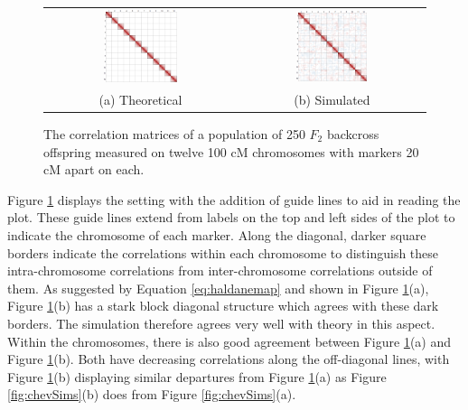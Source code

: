 \documentclass{article}
\begin{document}
\begin{figure}[htp]
  \begin{center}
    \begin{tabular}{cc}
      \includegraphics[width = 0.4\textwidth]{./img/LBSimTheory.png} &
      \includegraphics[width = 0.4\textwidth]{./img/LBSim.png} \\
      {\footnotesize (a) Theoretical} &
      {\footnotesize (b) Simulated} \\
    \end{tabular}
  \end{center}
  \caption{The correlation matrices of a population of 250 $F_2$ backcross offspring measured on twelve 100 cM chromosomes with markers 20 cM apart on each.}
  \label{fig:LBSims}
\end{figure}

Figure \ref{fig:LBSims} displays the \cite{LanderBotstein1989} setting with the addition of guide lines to aid in reading the plot. These guide lines extend from labels on the top and left sides of the plot to indicate the chromosome of each marker. Along the diagonal, darker square borders indicate the correlations within each chromosome to distinguish these intra-chromosome correlations from inter-chromosome correlations outside of them. As suggested by Equation \ref{eq:haldanemap} and shown in Figure \ref{fig:LBSims}(a), Figure \ref{fig:LBSims}(b) has a stark block diagonal structure which agrees with these dark borders. The simulation therefore agrees very well with theory in this aspect. Within the chromosomes, there is also good agreement between Figure \ref{fig:LBSims}(a) and Figure \ref{fig:LBSims}(b). Both have decreasing correlations along the off-diagonal lines, with Figure \ref{fig:LBSims}(b) displaying similar departures from Figure \ref{fig:LBSims}(a) as Figure \ref{fig:chevSims}(b) does from Figure \ref{fig:chevSims}(a).
\end{document}
